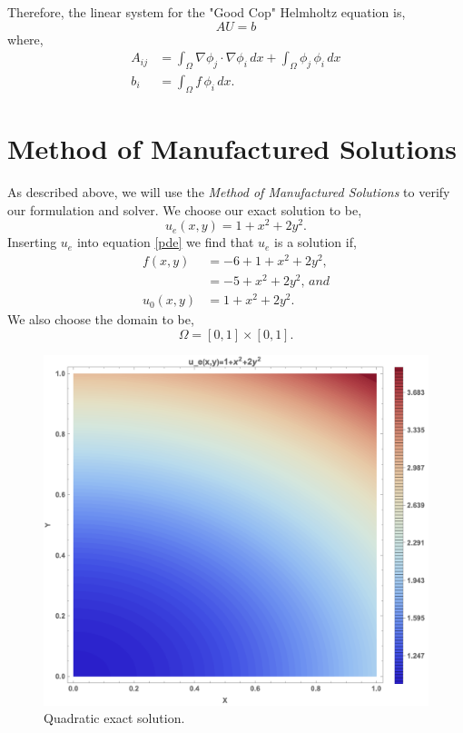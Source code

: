 Therefore, the linear system for the "Good Cop" Helmholtz equation is,
\begin{equation}
A U = b
\end{equation}
where,
\begin{align}
A_{ij} &= \int_{\Omega} \nabla \phi_j \cdot \nabla \phi_i \, dx + \int_{\Omega} \phi_j \, \phi_i \, dx \\
b_i &= \int_{\Omega} f \, \phi_i \, dx.
\end{align}

\section{Method of Manufactured Solutions}

As described above, we will use the \textit{Method of Manufactured Solutions} to verify our formulation and solver.  We choose our exact solution to be,
\begin{equation}
u_e(x,y) = 1 + x^2 + 2 y^2.
\end{equation}
Inserting $u_e$ into equation \eqref{pde} we find that $u_e$ is a solution if,
\begin{align}
f(x,y) &= -6 + 1 + x^2 + 2 y^2, \\
      &= -5 + x^2 + 2 y^2, \, and \\
u_0(x,y) &= 1 + x^2 + 2 y^2.
\end{align}
We also choose the domain to be,
\begin{equation}
\Omega = [0,1] \times [0,1].
\end{equation}
\begin{figure}[!ht]
\begin{center}
\includegraphics[scale=0.4]{figures/Quad_Exact_Mathematica.png}
\end{center}
\caption{Quadratic exact solution.}
\label{QuadExact}
\end{figure}


